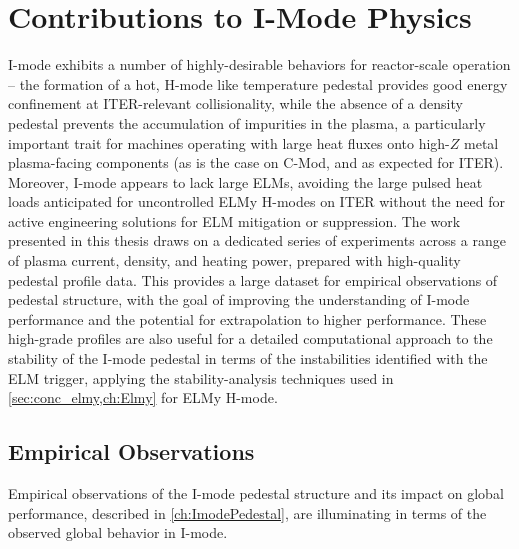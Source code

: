\section{Contributions to I-Mode Physics}\label{sec:conc_imode}

I-mode exhibits a number of highly-desirable behaviors for reactor-scale operation -- the formation of a hot, H-mode like temperature pedestal provides good energy confinement at ITER-relevant collisionality, while the absence of a density pedestal prevents the accumulation of impurities in the plasma, a particularly important trait for machines operating with large heat fluxes onto high-$Z$ metal plasma-facing components (as is the case on C-Mod, and as expected for ITER).  Moreover, I-mode appears to lack large ELMs, avoiding the large pulsed heat loads anticipated for uncontrolled ELMy H-modes on ITER without the need for active engineering solutions for ELM mitigation or suppression.  The work presented in this thesis draws on a dedicated series of experiments across a range of plasma current, density, and heating power, prepared with high-quality pedestal profile data.  This provides a large dataset for empirical observations of pedestal structure, with the goal of improving the understanding of I-mode performance and the potential for extrapolation to higher performance.  These high-grade profiles are also useful for a detailed computational approach to the stability of the I-mode pedestal in terms of the instabilities identified with the ELM trigger, applying the stability-analysis techniques used in \cref{sec:conc_elmy,ch:Elmy} for ELMy H-mode.

\subsection{Empirical Observations}\label{subsec:conc_imode_emp}

Empirical observations of the I-mode pedestal structure and its impact on global performance, described in \cref{ch:ImodePedestal}, are illuminating in terms of the observed global behavior in I-mode.  

